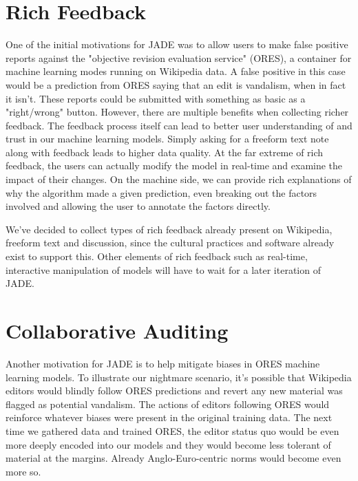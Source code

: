 \documentclass{sigchi-ext}
\begin{document}
\section{Rich Feedback}

One of the initial motivations for JADE was to allow users to make false positive reports against the "objective revision evaluation service" (ORES), a container for machine learning modes running on Wikipedia data.  A false positive in this case would be a prediction from ORES saying that an edit is vandalism, when in fact it isn't.  These reports could be submitted with something as basic as a "right/wrong" button.  However, there are multiple benefits when collecting richer feedback.  The feedback process itself can lead to better user understanding of and trust in our machine learning models.  Simply asking for a freeform text note along with feedback leads to higher data quality.  At the far extreme of rich feedback, the users can actually modify the model in real-time and examine the impact of their changes.\cite{amershi2014power} \cite{stumpf2009interacting}  On the machine side, we can provide rich explanations of why the algorithm made a given prediction, even breaking out the factors involved and allowing the user to annotate the factors directly.

We've decided to collect types of rich feedback already present on Wikipedia, freeform text and discussion, since the cultural practices and software already exist to support this.  Other elements of rich feedback such as real-time, interactive manipulation of models will have to wait for a later iteration of JADE.

\section{Collaborative Auditing}

Another motivation for JADE is to help mitigate biases in ORES machine learning models.  To illustrate our nightmare scenario, it's possible that Wikipedia editors would blindly follow ORES predictions and revert any new material was flagged as potential vandalism.  The actions of editors following ORES would reinforce whatever biases were present in the original training data.  The next time we gathered data and trained ORES, the editor status quo would be even more deeply encoded into our models and they would become less tolerant of material at the margins.  Already Anglo-Euro-centric norms\cite{ford2013getting} would become even more so.
\end{document}
